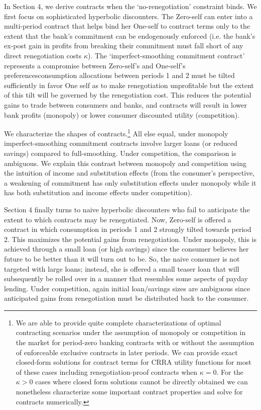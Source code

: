\documentclass[11pt,english]{article}
\theoremstyle{plain}
\theoremstyle{definition}
\begin{document}
In Section 4, we derive contracts when the `no-renegotiation' constraint
binds. We first focus on sophisticated hyperbolic discounters. The
Zero-self can enter into a multi-period contract that helps bind her
One-self to contract terms only to the extent that the bank's commitment
can be endogenously enforced (i.e. the bank's ex-post gain in profits
from breaking their commitment must fall short of any direct renegotiation
costs $\kappa$). The `imperfect-smoothing commitment contract' represents
a compromise between Zero-self's and One-self's preferences\textendash consumption
allocations between periods 1 and 2 must be tilted sufficiently in
favor One self  as to make renegotiation unprofitable but the extent of this tilt will be governed by the renegotiation cost.
This reduces the potential gains to trade between consumers and banks,
and contracts will result in lower bank profits (monopoly) or lower
consumer discounted utility (competition).

We characterize the shapes of contracts.\footnote{We are able to provide quite complete characterizations of optimal
contracting scenarios under the assumption of monopoly or competition
in the market for period-zero banking contracts with or without the
assumption of enforceable exclusive contracts in later periods. We
can provide exact closed-form solutions for contract terms for CRRA
utility functions for most of these cases including renegotiation-proof
contracts when $\kappa=0$. For the $\kappa>0$ cases where closed
form solutions cannot be directly obtained we can nonetheless characterize
some important contract properties and solve for contracts numerically.} All else equal, under monopoly imperfect-smoothing commitment contracts
involve larger loans (or reduced savings) compared to full-smoothing.
Under competition, the comparison is ambiguous. We explain this contrast
between monopoly and competition using the intuition of income and
substitution effects (from the consumer's perspective, a weakening
of commitment has only substitution effects under monopoly while it
has both substitution and income effects under competition).

Section 4 finally turns to naive hyperbolic discounters who fail to
anticipate the extent to which contracts may be renegotiated. Now,
Zero-self is offered a contract in which consumption in periods 1
and 2 strongly tilted towards period 2. This maximizes the potential
gains from renegotiation. Under monopoly, this is achieved through
a small loan (or high savings) since the consumer believes her future
to be better than it will turn out to be. So, the naive consumer is
not targeted with large loans; instead, she is offered a small teaser
loan that will subsequently be rolled over in a manner that resembles
some aspects of payday lending. Under competition, again initial loan/savings
sizes are ambiguous since anticipated gains from renegotiation must
be distributed back to the consumer.
\end{document}
